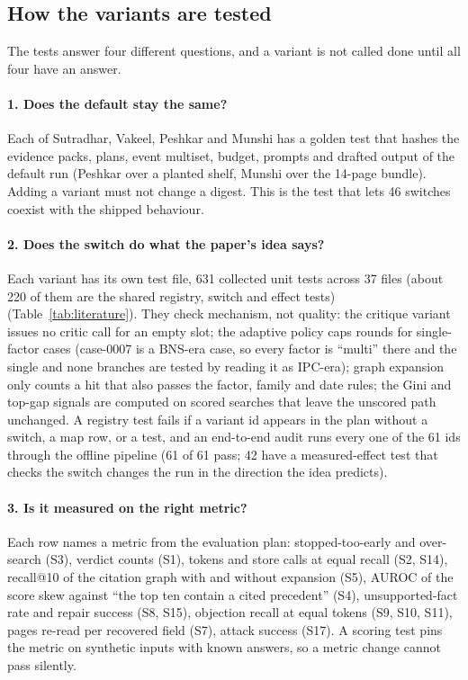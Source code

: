 \subsection{How the variants are tested}

The tests answer four different questions, and a variant is not called done until all four have an answer.

\paragraph{1. Does the default stay the same?} Each of Sutradhar, Vakeel, Peshkar and Munshi has a golden test that hashes the evidence packs, plans, event multiset, budget, prompts and drafted output of the default run (Peshkar over a planted shelf, Munshi over the 14-page bundle). Adding a variant must not change a digest. This is the test that lets 46 switches coexist with the shipped behaviour.

\paragraph{2. Does the switch do what the paper's idea says?} Each variant has its own test file, 631 collected unit tests across 37 files (about 220 of them are the shared registry, switch and effect tests) (Table~\ref{tab:literature}). They check mechanism, not quality: the critique variant issues no critic call for an empty slot; the adaptive policy caps rounds for single-factor cases (case-0007 is a BNS-era case, so every factor is ``multi'' there and the single and none branches are tested by reading it as IPC-era); graph expansion only counts a hit that also passes the factor, family and date rules; the Gini and top-gap signals are computed on scored searches that leave the unscored path unchanged. A registry test fails if a variant id appears in the plan without a switch, a map row, or a test, and an end-to-end audit runs every one of the 61 ids through the offline pipeline (61 of 61 pass; 42 have a measured-effect test that checks the switch changes the run in the direction the idea predicts).

\paragraph{3. Is it measured on the right metric?} Each row names a metric from the evaluation plan: stopped-too-early and over-search (S3), verdict counts (S1), tokens and store calls at equal recall (S2, S14), recall@10 of the citation graph with and without expansion (S5), AUROC of the score skew against ``the top ten contain a cited precedent'' (S4), unsupported-fact rate and repair success (S8, S15), objection recall at equal tokens (S9, S10, S11), pages re-read per recovered field (S7), attack success (S17). A scoring test pins the metric on synthetic inputs with known answers, so a metric change cannot pass silently.

